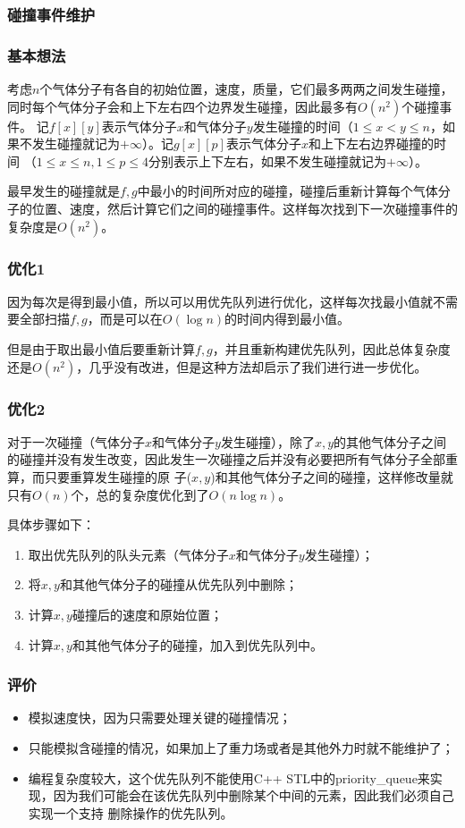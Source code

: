 ﻿\documentclass{article}
\begin{document}
	\subsubsection{碰撞事件维护}
	\subsubsection*{基本想法}
	\indent 考虑$n$个气体分子有各自的初始位置，速度，质量，它们最多两两之间发生碰撞，同时每个气体分子会和上下左右四个边界发生碰撞，因此最多有$O(n^2)$个碰撞事件。
	记$f[x][y]$表示气体分子$x$和气体分子$y$发生碰撞的时间（$1 \leq x < y \leq n$，如果不发生碰撞就记为$+\infty$）。记$g[x][p]$表示气体分子$x$和上下左右边界碰撞的时间
	（$1 \leq x \leq n, 1\leq p \leq 4$分别表示上下左右，如果不发生碰撞就记为$+\infty$）。\par
	最早发生的碰撞就是$f,g$中最小的时间所对应的碰撞，碰撞后重新计算每个气体分子的位置、速度，然后计算它们之间的碰撞事件。这样每次找到下一次碰撞事件的复杂度是$O(n^2)$。
	\subsubsection*{优化1}
	因为每次是得到最小值，所以可以用优先队列进行优化，这样每次找最小值就不需要全部扫描$f,g$，而是可以在$O(\log n)$的时间内得到最小值。\par
	但是由于取出最小值后要重新计算$f,g$，并且重新构建优先队列，因此总体复杂度还是$O(n^2)$，几乎没有改进，但是这种方法却启示了我们进行进一步优化。
	\subsubsection*{优化2}
	对于一次碰撞（气体分子$x$和气体分子$y$发生碰撞），除了$x,y$的其他气体分子之间的碰撞并没有发生改变，因此发生一次碰撞之后并没有必要把所有气体分子全部重算，而只要重算发生碰撞的原
	子($x,y$)和其他气体分子之间的碰撞，这样修改量就只有$O(n)$个，总的复杂度优化到了$O(n\log n)$。\par
	具体步骤如下：
	\begin{enumerate}
		\item 取出优先队列的队头元素（气体分子$x$和气体分子$y$发生碰撞）；
		\item 将$x,y$和其他气体分子的碰撞从优先队列中删除；
		\item 计算$x,y$碰撞后的速度和原始位置；
		\item 计算$x,y$和其他气体分子的碰撞，加入到优先队列中。
	\end{enumerate}
	\subsubsection{评价}
	\begin{itemize}
		\item 模拟速度快，因为只需要处理关键的碰撞情况；
		\item 只能模拟含碰撞的情况，如果加上了重力场或者是其他外力时就不能维护了；
		\item 编程复杂度较大，这个优先队列不能使用C++ STL中的priority\_queue来实现，因为我们可能会在该优先队列中删除某个中间的元素，因此我们必须自己实现一个支持
		删除操作的优先队列。
	\end{itemize}
	\newpage
\end{document}
